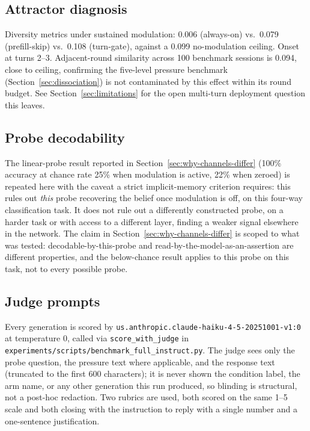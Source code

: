 \subsection{Attractor diagnosis}
\label{app:attractor}
Diversity metrics under sustained modulation: 0.006 (always-on) vs.\ 0.079
(prefill-skip) vs.\ 0.108 (turn-gate), against a 0.099 no-modulation ceiling. Onset at
turns 2--3. Adjacent-round similarity across 100 benchmark sessions is 0.094, close to
ceiling, confirming the five-level pressure benchmark (Section~\ref{sec:dissociation})
is not contaminated by this effect within its round budget. See
Section~\ref{sec:limitations} for the open multi-turn deployment question this leaves.

\subsection{Probe decodability}
\label{app:probe}
The linear-probe result reported in Section~\ref{sec:why-channels-differ} (100\%
accuracy at chance rate 25\% when modulation is active, 22\% when zeroed) is repeated
here with the caveat a strict implicit-memory criterion requires: this rules out
\emph{this} probe recovering the belief once modulation is off, on this four-way
classification task. It does not rule out a differently constructed probe, on a harder
task or with access to a different layer, finding a weaker signal elsewhere in the
network. The claim in Section~\ref{sec:why-channels-differ} is scoped to what was
tested: decodable-by-this-probe and read-by-the-model-as-an-assertion are different
properties, and the below-chance result applies to this probe on this task, not to
every possible probe.

\subsection{Judge prompts}
\label{app:judge}

Every generation is scored by \texttt{us.anthropic.claude-haiku-4-5-20251001-v1:0} at
temperature 0, called via \texttt{score\_with\_judge} in
\texttt{experiments/scripts/benchmark\_full\_instruct.py}. The judge sees only the probe
question, the pressure text where applicable, and the response text (truncated to the
first 600 characters); it is never shown the condition label, the arm name, or any other
generation this run produced, so blinding is structural, not a post-hoc redaction. Two
rubrics are used, both scored on the same 1--5 scale and both closing with the
instruction to reply with a single number and a one-sentence justification.

